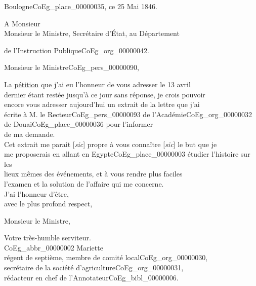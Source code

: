 \documentclass{book}
\begin{document}
\begin{flushright}Boulogne\gls{CoEg_place_00000035}, ce 25 Mai 1846.\end{flushright}
\indent A Monsieur\\
\indent \hspace{1cm} Monsieur le Ministre, Secrétaire d’État, au Département
\begin{center}de l’Instruction Publique\gls{CoEg_org_00000042}.\end{center}

\hspace{1cm} Monsieur le Ministre\gls{CoEg_pers_00000090},\\

\par La \hyperlink{CoEg_Mariette_1846-04-13_01}{pétition} que j’ai eu l’honneur de vous adresser le 13 avril\\
dernier étant restée jusqu’à ce jour sans réponse, je crois pouvoir\\
encore vous adresser aujourd’hui un extrait de la lettre que j’ai\\
écrite à M. le Recteur\gls{CoEg_pers_00000093} de l’Académie\gls{CoEg_org_00000032} de Douai\gls{CoEg_place_00000036} pour l’informer\\
de ma demande.\\
\indent Cet extrait me parait [\textit{sic}] propre à vous connaître [\textit{sic}] le but que je\\
me proposerais en allant en Egypte\gls{CoEg_place_00000003} étudier l’histoire sur les\\
lieux mêmes des événements, et à vous rendre plus faciles\\
l’examen et la solution de l’affaire qui me concerne.\\
\indent J’ai l’honneur d’être,\\
\hspace{1cm} avec le plus profond respect,
\begin{center}Monsieur le Ministre,\end{center}
\begin{center}\hspace{5cm}Votre très-humble serviteur.\\
\hspace{5cm}\gls{CoEg_abbr_00000002} Mariette\\
\hspace{5cm}régent de septième, membre de comité local\gls{CoEg_org_00000030},\\
\hspace{5cm}secrétaire de la société d’agriculture\gls{CoEg_org_00000031},\\
\hspace{5cm}rédacteur en chef de l’Annotateur\gls{CoEg_bibl_00000006}.\end{center}
\end{document}
